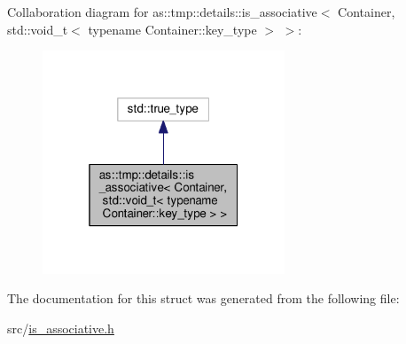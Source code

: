 Collaboration diagram for as\+:\+:tmp\+:\+:details\+:\+:is\+\_\+associative$<$ Container, std\+:\+:void\+\_\+t$<$ typename Container\+:\+:key\+\_\+type $>$ $>$\+:
\nopagebreak
\begin{figure}[H]
\begin{center}
\leavevmode
\includegraphics[width=205pt]{structas_1_1tmp_1_1details_1_1is__associative_3_01Container_00_01std_1_1void__t_3_01typename_01Caac0f829afd0b76a0bf08a7b10e9df26}
\end{center}
\end{figure}


The documentation for this struct was generated from the following file\+:\begin{DoxyCompactItemize}
\item 
src/\hyperlink{is__associative_8h}{is\+\_\+associative.\+h}\end{DoxyCompactItemize}
